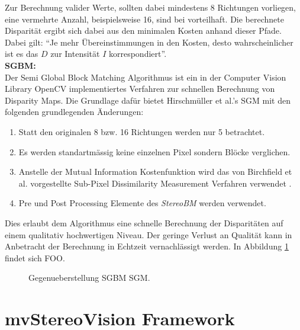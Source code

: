 \noindent
Zur Berechnung valider Werte, sollten dabei mindestens 8 Richtungen vorliegen, eine vermehrte Anzahl, beispielsweise 16, sind bei vorteilhaft. Die berechnete Disparität ergibt sich dabei aus den minimalen Kosten anhand dieser Pfade. Dabei gilt: “Je mehr Übereinstimmungen in den Kosten, desto wahrscheinlicher ist es das $D$ zur Intensität $I$ korrespondiert”.\\

\noindent
\textbf{SGBM:} \\
Der Semi Global Block Matching Algorithmus ist ein in der Computer Vision Library OpenCV implementiertes Verfahren zur schnellen Berechnung von Disparity Maps. Die Grundlage dafür bietet Hirschmüller et al.’s SGM \cite{hirschmueller2008sgm} mit den folgenden grundlegenden Änderungen:

\begin{enumerate}[label=C.\arabic*]
	\item Statt den originalen 8 bzw. 16 Richtungen werden nur 5 betrachtet. \label{item:differences_directions}
	\item Es werden  standartm\"assig keine einzelnen Pixel sondern Blöcke verglichen. \label{item:differences_matching}
	\item Anstelle der Mutual Information Kostenfunktion wird das von Birchfield et al. vorgestellte Sub-Pixel Dissimilarity Measurement Verfahren verwendet \cite{birchfield-tomasi}.
	\item Pre und Post Processing Elemente des \emph{StereoBM} \cite{opencv} werden verwendet.
\end{enumerate}

\noindent
Dies erlaubt dem Algorithmus eine schnelle Berechnung der Disparitäten auf einem qualitativ hochwertigen Niveau. Der geringe Verlust an Qualität kann in Anbetracht der Berechnung in Echtzeit vernachlässigt werden. In Abbildung \ref{fig:sgbm_vs_sgm} findet sich FOO.
\begin{figure}
	\begin{center}
	\end{center}
	\caption{Gegenueberstellung SGBM SGM.}
	\label{fig:sgbm_vs_sgm}
\end{figure}



\section{mvStereoVision Framework}
\label{sec:framework}

